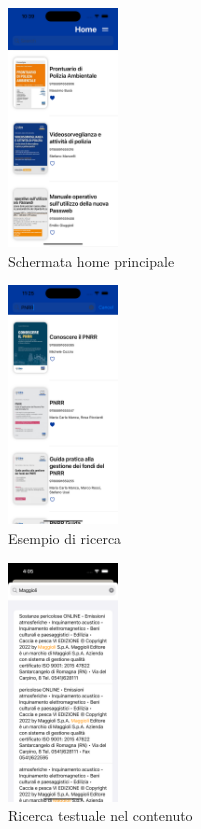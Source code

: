 \begin{multicols}{3}
    \begin{figure}[H]
        \centering
        \includegraphics[width=0.26\textwidth]{img/Simulator Screen Shot - iPhone 14 Pro - 2022-10-05 at 10.39.58.png}
        \caption{Schermata home principale}
        \label{home-ios}
    \end{figure}
    
    \begin{figure}[H]
        \centering
        \includegraphics[width=0.26\textwidth]{img/Simulator Screen Shot - iPhone 14 Pro - 2022-10-05 at 11.25.21.png}
        \caption{Esempio di ricerca}
        \label{ricerca-ios}
    \end{figure}

    \begin{figure}[H]
        \centering
        \includegraphics[width=0.26\textwidth]{img/ricerca_testo_ios.png}
        \caption{Ricerca testuale nel contenuto}
        \label{ricerca_testo-ios}
    \end{figure}


\end{multicols}

